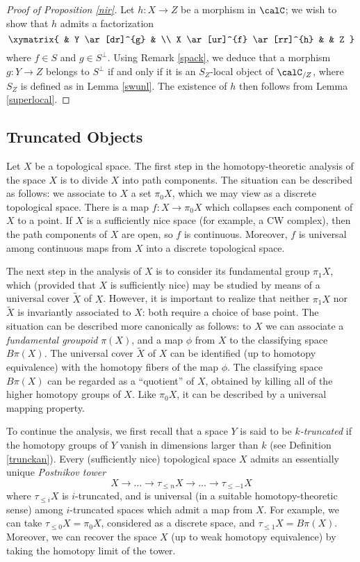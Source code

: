 \begin{proof}[Proof of Proposition \ref{nir}]
Let $h: X \rightarrow Z$ be a morphism in $\calC$; we wish to show that $h$ admits a factorization
$$ \xymatrix{ & Y \ar[dr]^{g} & \\
X \ar[ur]^{f} \ar[rr]^{h} & & Z }$$
where $f \in S$ and $g \in S^{\perp}$. Using Remark \ref{spack}, we deduce that a morphism
$g: Y \rightarrow Z$ belongs to $S^{\perp}$ if and only if it is an $S_{Z}$-local object of
$\calC_{/Z}$, where $S_Z$ is defined as in Lemma \ref{swunl}. The existence of $h$ then follows from
Lemma \ref{superlocal}.
\end{proof}


\subsection{Truncated Objects}\label{truncintro}

Let $X$ be a topological space. The first step in the homotopy-theoretic analysis of the space $X$ is to divide $X$ into path components. The situation can be described as follows: we associate to $X$ a set $\pi_0 X$, which we may view as a discrete topological space. There is a map $f: X \rightarrow \pi_0 X$ which collapses each component of $X$ to a point. If $X$ is a sufficiently nice space (for example, a CW complex), then the path components of $X$ are open, so $f$ is continuous. Moreover, $f$ is universal
among continuous maps from $X$ into a discrete topological space.

The next step in the analysis of $X$ is to consider its fundamental group $\pi_1 X$, which (provided that $X$ is sufficiently nice) may be studied by means of a universal cover $\widetilde{X}$ of $X$.
However, it is important to realize that neither $\pi_1 X$ nor $\widetilde{X}$ is invariantly associated to $X$: both require a choice of base point. The situation can be described more canonically as follows: to $X$ we can associate a {\em fundamental groupoid} $\pi(X)$, and a map $\phi$ from
$X$ to the classifying space $B \pi(X)$. The universal cover $\widetilde{X}$ of $X$ can be identified
(up to homotopy equivalence) with the homotopy fibers of the map $\phi$. The classifying space $B \pi(X)$ can be regarded as a ``quotient'' of $X$, obtained by killing all of the higher homotopy groups of $X$. Like $\pi_0 X$, it can be described by a universal mapping property. 

To continue the analysis, we first recall that a space $Y$ is said to be {\it $k$-truncated} if the homotopy groups of $Y$ vanish in dimensions larger than $k$ (see Definition \ref{trunckan}). 
Every (sufficiently nice) topological space $X$ admits an essentially unique {\em Postnikov tower}
$$ X \rightarrow \ldots \rightarrow \tau_{\leq n} X \rightarrow \ldots \rightarrow \tau_{\leq -1} X$$
where $\tau_{\leq i} X$ is $i$-truncated, and is universal (in a suitable homotopy-theoretic sense) among $i$-truncated spaces which admit a map from $X$. For example, we can take
$\tau_{\leq 0} X = \pi_0 X$, considered as a discrete space, and $\tau_{\leq 1} X = B \pi(X)$.
Moreover, we can recover the space $X$ (up to weak homotopy equivalence) by
taking the homotopy limit of the tower.

